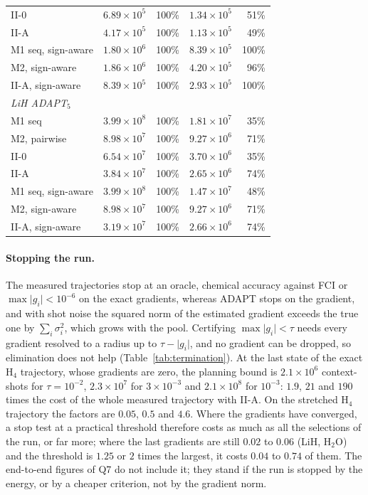 \documentclass[aps,pra,reprint,superscriptaddress,nofootinbib]{revtex4-2}
\begin{document}
\begin{table}[!htb]
\begin{tabular}{lrrrr}
II-0 & $6.89\times10^{5}$ & 100\% & $1.34\times10^{5}$ & 51\% \\
II-A & $4.17\times10^{5}$ & 100\% & $1.13\times10^{5}$ & 49\% \\
M1 seq, sign-aware & $1.80\times10^{6}$ & 100\% & $8.39\times10^{5}$ & 100\% \\
M2, sign-aware & $1.86\times10^{6}$ & 100\% & $4.20\times10^{5}$ & 96\% \\
II-A, sign-aware & $8.39\times10^{5}$ & 100\% & $2.93\times10^{5}$ & 100\% \\
\multicolumn{5}{l}{\emph{LiH ADAPT$_5$}} \\
M1 seq & $3.99\times10^{8}$ & 100\% & $1.81\times10^{7}$ & 35\% \\
M2, pairwise & $8.98\times10^{7}$ & 100\% & $9.27\times10^{6}$ & 71\% \\
II-0 & $6.54\times10^{7}$ & 100\% & $3.70\times10^{6}$ & 35\% \\
II-A & $3.84\times10^{7}$ & 100\% & $2.65\times10^{6}$ & 74\% \\
M1 seq, sign-aware & $3.99\times10^{8}$ & 100\% & $1.47\times10^{7}$ & 48\% \\
M2, sign-aware & $8.98\times10^{7}$ & 100\% & $9.27\times10^{6}$ & 71\% \\
II-A, sign-aware & $3.19\times10^{7}$ & 100\% & $2.66\times10^{6}$ & 74\% \\
\bottomrule
\end{tabular}
\end{table}

\paragraph{Stopping the run.} The measured trajectories stop at an oracle, chemical accuracy against FCI or $\max\lvert g_i\rvert<10^{-6}$ on the exact gradients, whereas ADAPT stops on the gradient, and with shot noise the squared norm of the estimated gradient exceeds the true one by $\sum_i\sigma_i^2$, which grows with the pool. Certifying $\max\lvert g_i\rvert<\tau$ needs every gradient resolved to a radius up to $\tau-\lvert g_i\rvert$, and no gradient can be dropped, so elimination does not help (Table~\ref{tab:termination}). At the last state of the exact H$_4$ trajectory, whose gradients are zero, the planning bound is $2.1\times10^{6}$ context-shots for $\tau=10^{-2}$, $2.3\times10^{7}$ for $3\times10^{-3}$ and $2.1\times10^{8}$ for $10^{-3}$: $1.9$, $21$ and $190$ times the cost of the whole measured trajectory with II-A. On the stretched H$_4$ trajectory the factors are $0.05$, $0.5$ and $4.6$. Where the gradients have converged, a stop test at a practical threshold therefore costs as much as all the selections of the run, or far more; where the last gradients are still $0.02$ to $0.06$ (LiH, H$_2$O) and the threshold is $1.25$ or $2$ times the largest, it costs $0.04$ to $0.74$ of them. The end-to-end figures of Q7 do not include it; they stand if the run is stopped by the energy, or by a cheaper criterion, not by the gradient norm.
\end{document}
